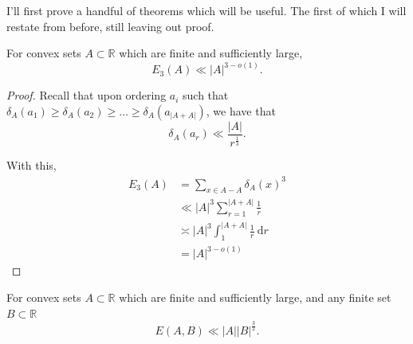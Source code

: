 \documentclass[12pt]{amsart}
\begin{document}
I'll first prove a handful of theorems which will be useful. The first of which
I will restate from before, still leaving out proof.

\begin{theorem}
For convex sets \(A \subset \mathbb{R} \) which are finite and sufficiently large,
\[
    E_{3} (A) \ll \left\lvert A \right\rvert ^{ 3 - o(1)}
.\]
\end{theorem}

\begin{proof}
Recall that upon ordering \(a_{i} \) such that \(\delta_A(a_1) \geq \delta_A(a_2) \geq \dots \geq \delta_{A} (a_{\left\lvert A+A \right\rvert } )\),
we have that
\[
    \delta_{A} (a_{r} ) \ll \frac{\left\lvert A \right\rvert }{r^{\frac{1}{3} }}
.\]

With this,
\begin{align*}
E_3(A) & = \sum _{x \in A-A} \delta_{A} (x)^{3} \\
& \ll \left\lvert A \right\rvert ^{3} \sum_{r=1}^{\left\lvert A+A \right\rvert } \frac{1}{r}\\
& \asymp \left\lvert A \right\rvert ^{3} \int_{1}^{\left\lvert A+A \right\rvert } \frac{1}{r}  ~\mathrm{d} r \\
& = \left\lvert A \right\rvert ^{3 - o(1)}
\end{align*}
\end{proof}

\begin{theorem}
For convex sets \(A \subset \mathbb{R} \) which are finite and sufficiently large, and any finite set \(B \subset \mathbb{R} \)
\[
    E(A,B) \ll \left\lvert A \right\rvert \left\lvert B \right\rvert ^{\frac{3}{2} }
.\]
\end{theorem}
\end{document}
